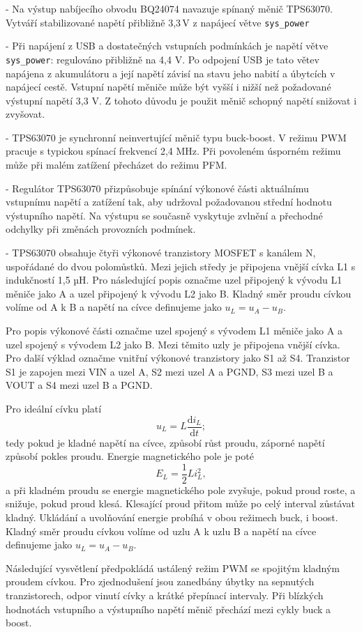 - Na výstup nabíjecího obvodu BQ24074 navazuje spínaný měnič TPS63070. Vytváří stabilizované napětí přibližně 3,3\,V z napájecí větve \texttt{sys\_power}


-  Při napájení z USB a dostatečných vstupních podmínkách je napětí větve \texttt{sys\_power}: regulováno přibližně na 4,4 V. Po odpojení USB je tato větev napájena z akumulátoru a její napětí závisí na stavu jeho nabití a úbytcích v napájecí cestě. Vstupní napětí měniče může být vyšší i nižší než požadované výstupní napětí 3,3 V. Z tohoto důvodu je použit měnič schopný napětí snižovat i zvyšovat.

- TPS63070 je synchronní neinvertující měnič typu buck-boost. V režimu PWM pracuje s typickou spínací frekvencí 2,4 MHz. Při povoleném úsporném režimu může při malém zatížení přecházet do režimu PFM.

- Regulátor TPS63070 přizpůsobuje spínání výkonové části aktuálnímu vstupnímu napětí a zatížení tak, aby udržoval požadovanou střední hodnotu výstupního napětí. Na výstupu se současně vyskytuje zvlnění a přechodné odchylky při změnách provozních podmínek.

- TPS63070 obsahuje čtyři výkonové tranzistory MOSFET s kanálem N, uspořádané do dvou polomůstků. Mezi jejich středy je připojena vnější cívka L1 s indukčností 1,5 µH. Pro následující popis označme uzel připojený k vývodu L1 měniče jako A a uzel připojený k vývodu L2 jako B. Kladný směr proudu cívkou volíme od A k B a napětí na cívce definujeme jako \(u_L=u_A-u_B\).

Pro popis výkonové části označme uzel spojený s vývodem L1 měniče jako A a uzel spojený s vývodem L2 jako B. Mezi těmito uzly je připojena vnější cívka. Pro další výklad označme vnitřní výkonové tranzistory jako S1 až S4. Tranzistor S1 je zapojen mezi VIN a uzel A, S2 mezi uzel A a PGND, S3 mezi uzel B a VOUT a S4 mezi uzel B a PGND.


Pro ideální cívku platí \[
u_L=L\frac{\mathrm{d}i_L}{\mathrm{d}t};
\] tedy pokud je kladné napětí na cívce, způsobí růst proudu, záporné napětí způsobí pokles proudu. Energie magnetického pole je poté \[
E_L=\frac12Li_L^2,
\] a při kladném proudu se energie magnetického pole zvyšuje, pokud proud roste, a snižuje, pokud proud klesá. Klesající proud přitom může po celý interval zůstávat kladný. Ukládání a uvolňování energie probíhá v obou režimech buck, i boost. Kladný směr proudu cívkou volíme od uzlu A k uzlu B a napětí na cívce definujeme jako \(u_L=u_A-u_B\).

Následující vysvětlení předpokládá ustálený režim PWM se spojitým kladným proudem cívkou. Pro zjednodušení jsou zanedbány úbytky na sepnutých tranzistorech, odpor vinutí cívky a krátké přepínací intervaly. Při blízkých hodnotách vstupního a výstupního napětí měnič přechází mezi cykly buck a boost.

